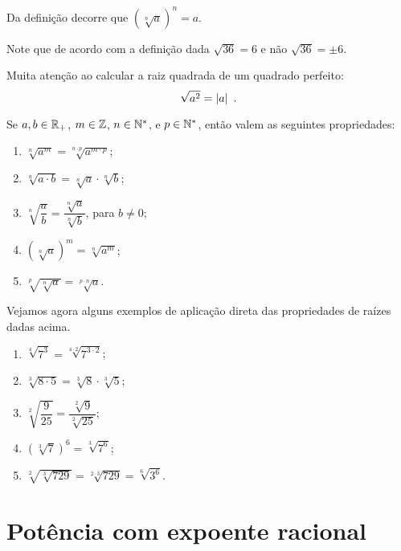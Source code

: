  \vskip0.3cm

 \begin{obs}
 Da definição decorre que $(\sqrt[n]{a})^n=a$.
 \end{obs}

 \begin{obs}
 Note que de acordo com a definição dada $\sqrt{36}= 6$ e não $\sqrt{36}= \pm 6$.
 \end{obs}

 \begin{obs}
 Muita atenção ao calcular a raiz quadrada de um quadrado perfeito:
 \[\sqrt{a^2}= \left|a\right| \ . \]
 \end{obs}

 Se $a, b \in \mathbb{R}_{+}$, $m \in \mathbb{Z}$, $n \in \mathbb{N}^{*}$, e $p \in \mathbb{N}^{*}$, então valem as seguintes propriedades:
 \begin{enumerate}[R1)]
 \item $\sqrt[n]{a^m}= \sqrt[n \cdot p]{a^{m\cdot p}}$;
 \item $\sqrt[n]{a \cdot b}= \sqrt[n]{a} \cdot \sqrt[n]{b}$;
 \item $\sqrt[n]{\dfrac{a}{b}}= \dfrac{\sqrt[n]{a}}{\sqrt[n]{b}}$, para $b \neq 0$;
 \item $(\sqrt[n]{a})^m= \sqrt[n]{a^m}$;
 \item $\sqrt[p]{\sqrt[n]{a}}= \sqrt[p \cdot n]{a}$.
 \end{enumerate}

 \begin{exem} Vejamos agora alguns exemplos de aplicação direta das propriedades de raízes dadas acima.
  \begin{enumerate}[R1)]
   \item $\sqrt[4]{7^3}= \sqrt[4 \cdot 2]{7^{3\cdot 2}}$;
 \item $\sqrt[3]{8 \cdot 5}= \sqrt[3]{8} \cdot \sqrt[3]{5}$;
 \item $\sqrt[2]{\dfrac{9}{25}}= \dfrac{\sqrt[2]{9}}{\sqrt[2]{25}}$;
 \item $\left(\sqrt[3]{7}\right)^6= \sqrt[3]{7^6}$;
 \item $\sqrt[2]{\sqrt[3]{729}}= \sqrt[2 \cdot 3]{729}= \sqrt[6]{3^6}$.
  \end{enumerate}

 \end{exem}


 \section{Potência com expoente racional}

